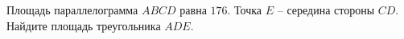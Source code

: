 \begin{ex}
	\begin{condition}
		Площадь параллелограмма \( ABCD \) равна \( 176 \). Точка \( E \) – середина стороны \( CD \). Найдите площадь треугольника \( ADE \).
	\end{condition}
\end{ex}